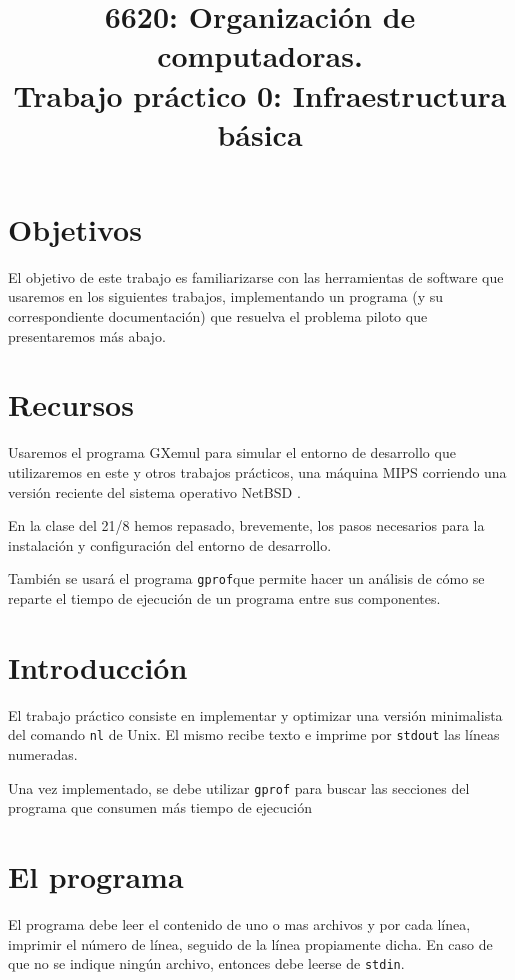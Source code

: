 \documentclass[9pt,a4paper]{article}
\title{6620: Organización de computadoras.\\ Trabajo práctico 0: Infraestructura básica}
\newcommand{\stdout}{\texttt{stdout}}
\newcommand{\stdin}{\texttt{stdin}}
\newcommand{\gprof}{\texttt{gprof}}
\newcommand{\nl}{\texttt{nl}}
\begin{document}
\maketitle
 \section{Objetivos}
El objetivo de este trabajo es familiarizarse con las herramientas de software que usaremos en los siguientes
trabajos, implementando un programa (y su correspondiente documentación) que 
resuelva el problema piloto que presentaremos más abajo.
 
 \section{Recursos}
 
Usaremos el programa GXemul \cite{GXEMUL} para simular el entorno de desarrollo
que utilizaremos en este y otros trabajos prácticos, una máquina MIPS corriendo
una versión reciente del sistema operativo NetBSD \cite{NETBSD}.

En la clase del 21/8 hemos repasado, brevemente, los pasos necesarios para la 
instalación y configuración del entorno de desarrollo.

También se usará el programa \gprof que permite hacer un análisis de cómo se reparte el tiempo de ejecución de un programa entre sus componentes.
\section{Introducción}
El trabajo práctico consiste en implementar y optimizar una versión minimalista
del comando \nl\cite{NL} de Unix. El mismo recibe texto e imprime por \stdout{} las 
líneas numeradas.

Una vez implementado, se debe utilizar
\texttt{gprof}\cite{GPROF} para buscar las secciones del programa que consumen
más tiempo de ejecución

\section{El programa}
El programa debe leer el contenido de uno o mas archivos y por cada línea, imprimir el número de línea, seguido de la línea propiamente dicha.
En caso de que no se indique ningún archivo, entonces debe leerse de \stdin.
\end{document}
